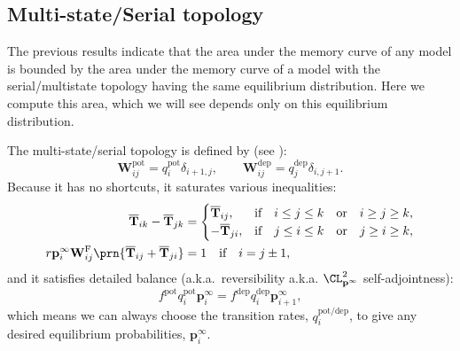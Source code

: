\documentclass{article} %
\newcommand{\pr}{\mathbf{p}}
\newcommand{\eq}{\pr^\infty}
\newcommand{\fpt}{\mathbf{T}}
\newcommand{\fptb}{\overline{\fpt}}
\newcommand{\W}{\mathbf{W}}
\newcommand{\frg}{\W^{\mathrm{F}}}
\newcommand{\pot}{^{\text{pot}}}
\newcommand{\dep}{^{\text{dep}}}
\newcommand{\potdep}{^{\text{pot/dep}}}
\begin{document}
\subsection{Multi-state/Serial topology}\label{sec:multistate}

The previous results indicate that the area under the memory curve of any model is bounded by the area under the memory curve of a model with the serial/multistate topology having the same equilibrium distribution.
Here we compute this area, which we will see depends only on this equilibrium distribution.

The multi-state/serial topology is defined by (see \cite{amit1994learning,Fusi2007multistate,Leibold2008serial}):
%
\begin{equation}\label{eq:multistatedef}
  \W\pot _{ij} = q\pot _i \delta_{i+1,j},
  \qquad
  \W\dep _{ij} = q\dep _j \delta_{i,j+1}.
\end{equation}
%
Because it has no shortcuts, it saturates various inequalities:
%
\begin{equation}\label{eq:multistateineq}
  \begin{aligned}
    \fptb_{ik} - \fptb_{jk} &=
      \begin{cases}
        \fptb_{ij},  &\text{if}\quad i \leq j \leq k \quad\text{or}\quad i \geq j \geq k,\\
        -\fptb_{ji}, &\text{if}\quad j \leq i \leq k \quad\text{or}\quad j \geq i \geq k,\\
      \end{cases} \\
    r\eq_i \frg_{ij} \prn{\fptb_{ij}+\fptb_{ji}} &= 1 \quad\text{if}\quad i=j\pm1,
  \end{aligned}
\end{equation}
%
and it satisfies detailed balance (a.k.a.\ reversibility a.k.a. $\CL^2_{\eq}$ self-adjointness):
%
\begin{equation}\label{eq:multistateprob}
  f\pot  q\pot _i \eq_i = f\dep  q\dep _i \eq_{i+1},
\end{equation}
%
which means we can always choose the transition rates, $q\potdep _i$, to give any desired equilibrium probabilities, $\eq_i$.
\end{document}
